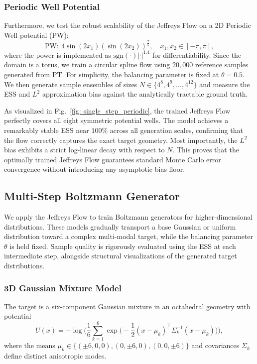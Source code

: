 \documentclass[%
 reprint,
 amsmath,amssymb,
 aps,
 pre,
]{revtex4-2}
\newcommand{\T}{\top}
\begin{document}
\subsubsection*{Periodic Well Potential}

Furthermore, we test the robust scalability of the Jeffreys Flow on a 2D Periodic Well potential (PW):
\begin{equation*}
	\mathrm{PW:}~4 \sin(2x_1 )(\sin(2x_2))^{\frac75}, \quad 
	x_1, x_2 \in [-\pi, \pi],
\end{equation*}
where the power is implemented as $\mathrm{sgn}(\cdot)|\cdot|^{1.4}$ for differentiability. Since the domain is a torus, we train a circular spline flow using $20,000$ reference samples generated from PT. For simplicity, the balancing parameter is fixed at $\theta=0.5$. We then generate sample ensembles of sizes $N \in \{4^8, 4^9, \dots, 4^{12}\}$ and measure the ESS and $L^2$ approximation bias against the analytically tractable ground truth.

As visualized in Fig.~\ref{fig: single_step_periodic}, the trained Jeffreys Flow perfectly covers all eight symmetric potential wells. The model achieves a remarkably stable ESS near $100\%$ across all generation scales, confirming that the flow correctly captures the exact target geometry. Most importantly, the $L^2$ bias exhibits a strict log-linear decay with respect to $N$. This proves that the optimally trained Jeffreys Flow guarantees standard Monte Carlo error convergence without introducing any asymptotic bias floor.



\subsection{Multi-Step Boltzmann Generator}

We apply the Jeffreys Flow to train Boltzmann generators for higher-dimensional distributions. These models gradually transport a base Gaussian or uniform distribution toward a complex multi-modal target, while the balancing parameter $\theta$ is held fixed. Sample quality is rigorously evaluated using the ESS at each intermediate step, alongside structural visualizations of the generated target distributions.

\subsubsection*{3D Gaussian Mixture Model}

The target is a six-component Gaussian mixture in an octahedral geometry with potential
\begin{equation*}
	U(x)=-\log \bigg( \frac{1}{6} \sum_{k=1}^6 \exp \bigg( -\frac{1}{2} (x - \mu_k)^\T \Sigma_k^{-1} (x - \mu_k) \bigg) \bigg),
\end{equation*}
where the means $\mu_k \in \{(\pm 6, 0, 0), (0, \pm 6, 0), (0, 0, \pm 6)\}$ and covariances $\Sigma_k$ define distinct anisotropic modes.
\end{document}
